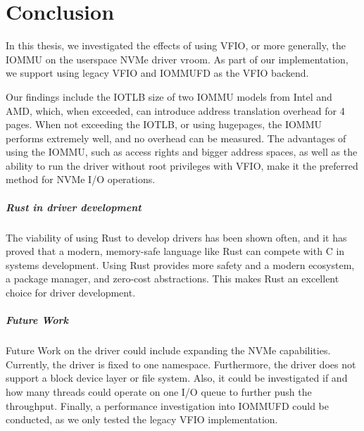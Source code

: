 \chapter{Conclusion}
In this thesis, we investigated the effects of using VFIO, or more generally, the IOMMU on the userspace NVMe driver vroom.
As part of our implementation, we support using legacy VFIO and IOMMUFD as the VFIO backend.

Our findings include the IOTLB size of two IOMMU models from Intel and AMD, which, when exceeded, can introduce address translation overhead for \qty{4}{\kibi\byte} pages.
When not exceeding the IOTLB, or using hugepages, the IOMMU performs extremely well, and no overhead can be measured.
The advantages of using the IOMMU, such as access rights and bigger address spaces, as well as the ability to run the driver without root privileges with VFIO, make it the preferred method for NVMe I/O operations.

\paragraph{Rust in driver development}
The viability of using Rust to develop drivers has been shown often, and it has proved that a modern, memory-safe language like Rust can compete with C in systems development. Using Rust provides more safety and a modern ecosystem, a package manager, and zero-cost abstractions. This makes Rust an excellent choice for driver development.

\paragraph{Future Work}
Future Work on the driver could include expanding the NVMe capabilities. Currently, the driver is fixed to one namespace. Furthermore, the driver does not support a block device layer or file system.
Also, it could be investigated if and how many threads could operate on one I/O queue to further push the throughput. Finally, a performance investigation into IOMMUFD could be conducted, as we only tested the legacy VFIO implementation.